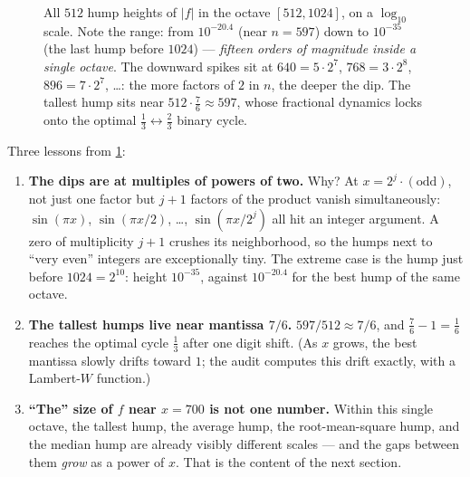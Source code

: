 \documentclass[11pt,oneside]{article}
\theoremstyle{remark}
\begin{document}
\begin{figure}[ht]
\caption{All $512$ hump heights of $|f|$ in the octave
$[512,1024]$, on a $\log_{10}$ scale.  Note the range: from
$10^{-20.4}$ (near $n=597$) down to $10^{-35}$ (the last hump before
$1024$) --- \emph{fifteen orders of magnitude inside a single
octave}.  The downward spikes sit at $640=5\cdot2^7$,
$768=3\cdot2^8$, $896=7\cdot2^7$, \dots: the more factors of $2$ in
$n$, the deeper the dip.  The tallest hump sits near
$512\cdot\tfrac76\approx597$, whose fractional dynamics locks onto the
optimal $\tfrac13\leftrightarrow\tfrac23$ binary cycle.}
\label{fig:octave}
\end{figure}

Three lessons from \cref{fig:octave}:

\begin{enumerate}
\item \textbf{The dips are at multiples of powers of two.}  Why?  At
$x=2^j\cdot(\text{odd})$, not just one factor but $j+1$ factors of the
product vanish simultaneously: $\sin(\pi x)$, $\sin(\pi x/2)$,
\dots, $\sin(\pi x/2^{j})$ all hit an integer argument.  A zero of
multiplicity $j+1$ crushes its neighborhood, so the humps next to
``very even'' integers are exceptionally tiny.  The extreme case is
the hump just before $1024=2^{10}$: height $10^{-35}$, against
$10^{-20.4}$ for the best hump of the same octave.
\item \textbf{The tallest humps live near mantissa $7/6$.}
$597/512\approx7/6$, and $\tfrac76-1=\tfrac16$ reaches the optimal
cycle $\tfrac13$ after one digit shift.  (As $x$ grows, the best
mantissa slowly drifts toward $1$; the audit computes this drift
exactly, with a Lambert-$W$ function.)
\item \textbf{``The'' size of $f$ near $x=700$ is not one number.}
Within this single octave, the tallest hump, the average hump, the
root-mean-square hump, and the median hump are already visibly
different scales --- and the gaps between them \emph{grow} as a power
of $x$.  That is the content of the next section.
\end{enumerate}
\end{document}
